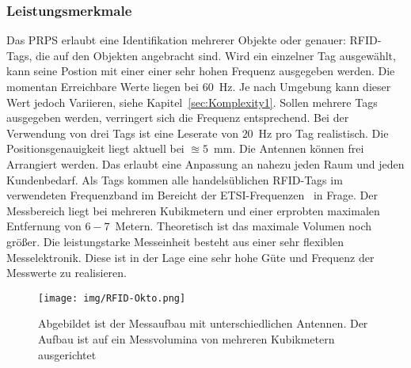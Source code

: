 \subsubsection{Leistungsmerkmale}
%
Das PRPS erlaubt eine Identifikation mehrerer Objekte oder genauer: RFID-Tags, die auf den Objekten angebracht sind. Wird ein einzelner Tag ausgewählt, kann seine Postion mit einer einer sehr hohen Frequenz ausgegeben werden. Die momentan Erreichbare Werte liegen bei $60$~Hz. Je nach Umgebung kann dieser Wert jedoch Variieren, siehe Kapitel~\ref{sec:Komplexity1}. Sollen mehrere Tags ausgegeben werden, verringert sich die Frequenz entsprechend. Bei der Verwendung von drei Tags ist eine Leserate von $20$~Hz pro Tag realistisch. Die Positionsgenauigkeit liegt aktuell bei $\approxeq 5$~mm. Die Antennen können frei Arrangiert werden. Das erlaubt eine Anpassung an nahezu jeden Raum und jeden Kundenbedarf. Als Tags kommen alle handelsüblichen RFID-Tags im verwendeten Frequenzband im Bereicht der ETSI-Frequenzen~\cite{etsi1} in Frage. Der Messbereich liegt bei mehreren Kubikmetern und einer erprobten maximalen Entfernung von $6-7$~Metern. Theoretisch ist das maximale Volumen noch größer. Die leistungstarke Messeinheit besteht aus einer sehr flexiblen Messelektronik. Diese ist in der Lage eine sehr hohe Güte und Frequenz der Messwerte zu realisieren.\\

%
\begin{figure}[h]
         \centering
         \caption[Messaufbau der Amedo GmbH]{Abgebildet ist der Messaufbau mit unterschiedlichen Antennen. Der Aufbau ist auf ein Messvolumina von mehreren Kubikmetern ausgerichtet}
		\label{fig:Setup}
		\vspace{2mm}
         \texttt{[image: img/RFID-Okto.png]}
         
\end{figure}